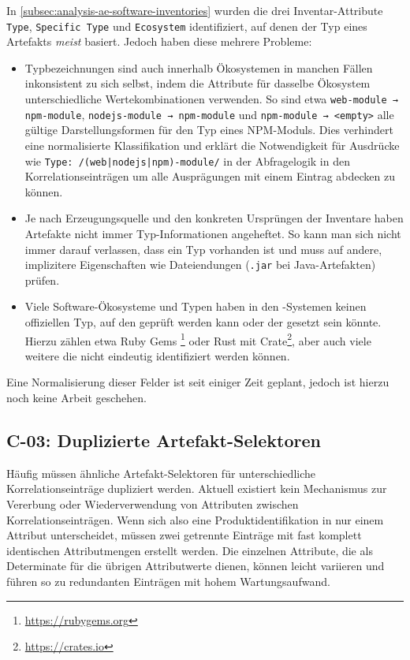 In \autoref{subsec:analysis-ae-software-inventories} wurden die drei Inventar-Attribute \texttt{Type}, \texttt{Specific Type} und \texttt{Ecosystem} identifiziert, auf denen der Typ eines Artefakts \textit{meist} basiert.
Jedoch haben diese mehrere Probleme:

\begin{itemize}
    \item Typbezeichnungen sind auch innerhalb Ökosystemen in manchen Fällen inkonsistent zu sich selbst, indem die Attribute für dasselbe Ökosystem unterschiedliche Wertekombinationen verwenden.
    So sind etwa \texttt{web-module → npm-module}, \texttt{nodejs-module → npm-module} und \texttt{npm-module → <empty>} alle gültige Darstellungsformen für den Typ eines NPM-Moduls.
    Dies verhindert eine normalisierte Klassifikation und erklärt die Notwendigkeit für Ausdrücke wie \texttt{Type: /(web|nodejs|npm)-module/} in der Abfragelogik in den Korrelationseinträgen um alle Ausprägungen mit einem Eintrag abdecken zu können.

    \item Je nach Erzeugungsquelle und den konkreten Ursprüngen der Inventare haben Artefakte nicht immer Typ-Informationen angeheftet.
    So kann man sich nicht immer darauf verlassen, dass ein Typ vorhanden ist und muss auf andere, implizitere Eigenschaften wie Dateiendungen (\texttt{.jar} bei Java-Artefakten) prüfen.

    \item Viele Software-Ökosysteme und Typen haben in den \metaeffekt-Systemen keinen offiziellen Typ, auf den geprüft werden kann oder der gesetzt sein könnte.
    Hierzu zählen etwa Ruby Gems \footnote{\url{https://rubygems.org}} oder Rust mit Crate\footnote{\url{https://crates.io}}, aber auch viele weitere die nicht eindeutig identifiziert werden können.
\end{itemize}

Eine Normalisierung dieser Felder ist seit einiger Zeit geplant, jedoch ist hierzu noch keine Arbeit geschehen.

\subsection{C-03: Duplizierte Artefakt-Selektoren}\label{subsec:c-03-duplizierte-artefakt-selektoren}


Häufig müssen ähnliche Artefakt-Selektoren für unterschiedliche Korrelationseinträge dupliziert werden.
Aktuell existiert kein Mechanismus zur Vererbung oder Wiederverwendung von Attributen zwischen Korrelationseinträgen.
Wenn sich also eine Produktidentifikation in nur einem Attribut unterscheidet, müssen zwei getrennte Einträge mit fast komplett identischen Attributmengen erstellt werden.
Die einzelnen Attribute, die als Determinate für die übrigen Attributwerte dienen, können leicht variieren und führen so zu redundanten Einträgen mit hohem Wartungsaufwand.

